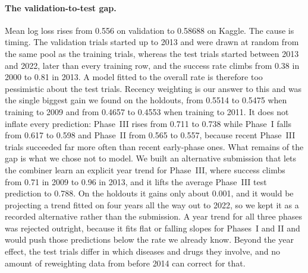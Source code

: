 \paragraph{The validation-to-test gap.}
Mean log loss rises from 0.556 on validation to 0.58688 on Kaggle. The cause is
timing. The validation trials started up to 2013 and were drawn at random from the
same pool as the training trials, whereas the test trials started between 2013 and
2022, later than every training row, and the success rate climbs from 0.38 in 2000
to 0.81 in 2013. A model fitted to the overall rate is therefore too pessimistic
about the test trials. Recency weighting is our answer to this and was the single
biggest gain we found on the holdouts, from 0.5514 to 0.5475 when training to 2009
and from 0.4657 to 0.4553 when training to 2011. It does not inflate every
prediction: Phase~III rises from 0.711 to 0.738 while Phase~I falls from 0.617 to
0.598 and Phase~II from 0.565 to 0.557, because recent Phase~III trials succeeded
far more often than recent early-phase ones. What remains of the gap is what we
chose not to model. We built an alternative submission that lets the combiner
learn an explicit year trend for Phase~III, where success climbs from 0.71 in 2009
to 0.96 in 2013, and it lifts the average Phase~III test prediction to 0.788. On
the holdouts it gains only about 0.001, and it would be projecting a trend fitted
on four years all the way out to 2022, so we kept it as a recorded alternative
rather than the submission. A year trend for all three phases was rejected
outright, because it fits flat or falling slopes for Phases~I and II and would
push those predictions below the rate we already know. Beyond the year effect, the
test trials differ in which diseases and drugs they involve, and no amount of
reweighting data from before 2014 can correct for that.
